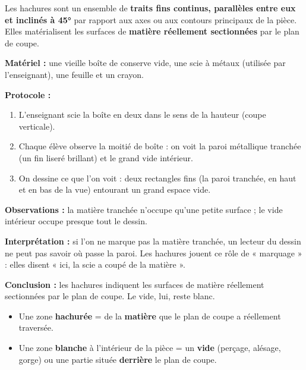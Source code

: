 \documentclass[11pt]{article}
\newcommand{\cle}[1]{{\popxbold\color{popdark}#1}}
\begin{document}
\begin{definition}
Les \cle{hachures} sont un ensemble de \textbf{traits fins continus, parallèles entre eux et inclinés à \ang{45}} par rapport aux axes ou aux contours principaux de la pièce. Elles matérialisent les surfaces de \textbf{matière réellement sectionnées} par le plan de coupe.
\end{definition}

\begin{experience}
\textbf{Matériel :} une vieille boîte de conserve vide, une scie à métaux (utilisée par l'enseignant), une feuille et un crayon.\par
\textbf{Protocole :}
\begin{enumerate}
\item L'enseignant scie la boîte en deux dans le sens de la hauteur (coupe verticale).
\item Chaque élève observe la moitié de boîte : on voit la paroi métallique tranchée (un fin liseré brillant) et le grand vide intérieur.
\item On dessine ce que l'on voit : deux rectangles fins (la paroi tranchée, en haut et en bas de la vue) entourant un grand espace vide.
\end{enumerate}
\textbf{Observations :} la matière tranchée n'occupe qu'une petite surface ; le vide intérieur occupe presque tout le dessin.\par
\textbf{Interprétation :} si l'on ne marque pas la matière tranchée, un lecteur du dessin ne peut pas savoir où passe la paroi. Les hachures jouent ce rôle de « marquage » : elles disent « ici, la scie a coupé de la matière ».\par
\textbf{Conclusion :} les hachures indiquent les surfaces de matière réellement sectionnées par le plan de coupe. Le vide, lui, reste blanc.
\end{experience}

\begin{aretenir}
\begin{itemize}
\item Une zone \textbf{hachurée} = de la \textbf{matière} que le plan de coupe a réellement traversée.
\item Une zone \textbf{blanche} à l'intérieur de la pièce = un \textbf{vide} (perçage, alésage, gorge) ou une partie située \textbf{derrière} le plan de coupe.
\end{itemize}
\end{aretenir}
\end{document}
